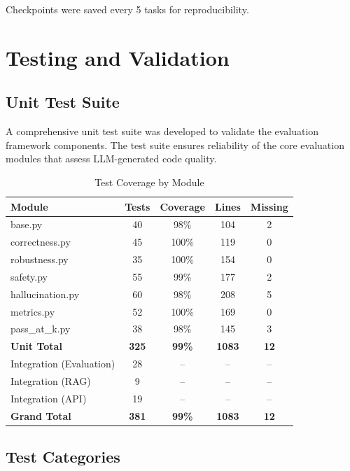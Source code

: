 \documentclass[12pt,a4paper]{article}
\begin{document}
Checkpoints were saved every 5 tasks for reproducibility.

\section{Testing and Validation}

\subsection{Unit Test Suite}

A comprehensive unit test suite was developed to validate the evaluation framework components. The test suite ensures reliability of the core evaluation modules that assess LLM-generated code quality.

\begin{table}[H]
\centering
\caption{Test Coverage by Module}
\begin{tabular}{lcccc}
\toprule
\textbf{Module} & \textbf{Tests} & \textbf{Coverage} & \textbf{Lines} & \textbf{Missing} \\
\midrule
base.py & 40 & 98\% & 104 & 2 \\
correctness.py & 45 & 100\% & 119 & 0 \\
robustness.py & 35 & 100\% & 154 & 0 \\
safety.py & 55 & 99\% & 177 & 2 \\
hallucination.py & 60 & 98\% & 208 & 5 \\
metrics.py & 52 & 100\% & 169 & 0 \\
pass\_at\_k.py & 38 & 98\% & 145 & 3 \\
\midrule
\textbf{Unit Total} & \textbf{325} & \textbf{99\%} & \textbf{1083} & \textbf{12} \\
\midrule
Integration (Evaluation) & 28 & -- & -- & -- \\
Integration (RAG) & 9 & -- & -- & -- \\
Integration (API) & 19 & -- & -- & -- \\
\midrule
\textbf{Grand Total} & \textbf{381} & \textbf{99\%} & \textbf{1083} & \textbf{12} \\
\bottomrule
\end{tabular}
\label{tab:test_coverage}
\end{table}

\subsection{Test Categories}
\end{document}
